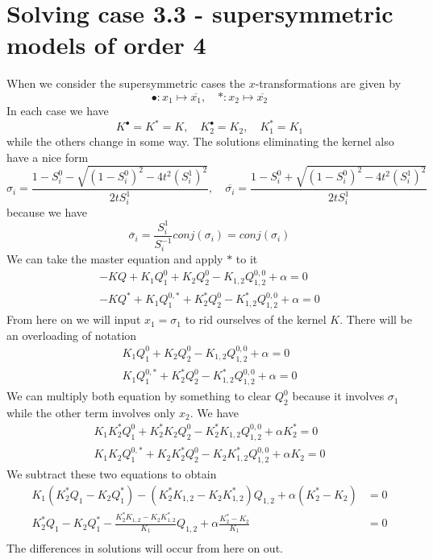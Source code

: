 \documentclass[12pt]{article}
\theoremstyle{definition} \newtheorem{definition}[theorem]{Definition}
\newcommand{\ol}[1]{\overline{#1}}
\newcommand{\exx}{\!\!}
\begin{document}
\section{Solving case 3.3 - supersymmetric models of order 4}
When we consider the supersymmetric cases the $x$-transformations are given by
\[
\bullet : x_1 \mapsto \ol{x_1},\quad\ast: x_2 \mapsto \ol{x_2}
\]
In each case we have
\[
  K^{\bullet} = K^{\ast} = K,\quad K_2^{\bullet} = K_2,\quad K_1^{\ast} = K_1
\]
while the others change in some way. The solutions eliminating the kernel also have a nice form
\[
    \sigma_i = \frac{1-S_i^0-\sqrt{(1-S_i^0)^2-4t^2 (S_i^1)^2}}{2tS_i^1},\quad\ol{\sigma_i} = \frac{1-S_i^0+\sqrt{(1-S_i^0)^2-4t^2 (S_i^1)^2}}{2tS_i^1}
\]
because we have
\[
	\ol{\sigma}_i = \frac{S_i^1}{S_i^{-1}}conj(\sigma_i) = conj(\sigma_i) 
\]
We can take the master equation and apply $\ast$ to it
\begin{align*}
-KQ + K_1 Q_1^0 + K_2 Q_2^0 - K_{1,2}Q_{1,2}^{0,0} + \alpha = 0\\
-KQ^\ast \exx+ K_1 Q_1^{0,\ast} \exx+ K_2^\ast Q_2^0 - K_{1,2}^\ast Q_{1,2}^{0,0} + \alpha = 0
\end{align*}
From here on we will input $x_1 = \sigma_1$ to rid ourselves of the kernel $K$. There will be an overloading of notation
\begin{align*}
K_1 Q_1^0 + K_2 Q_2^0 - K_{1,2}Q_{1,2}^{0,0} + \alpha = 0\\
K_1 Q_1^{0,\ast} \exx+ K_2^\ast Q_2^0 - K_{1,2}^\ast Q_{1,2}^{0,0} + \alpha = 0
\end{align*}
We can multiply both equation by something to clear $Q_2^0$ because it involves $\sigma_1$ while the other term involves only $x_2$. We have
\begin{align*}
K_1 K_2^\ast Q_1^0 +K_2^\ast K_2 Q_2^0 - K_2^\ast K_{1,2}Q_{1,2}^{0,0} + \alpha K_2^\ast= 0\\
K_1 K_2 Q_1^{0,\ast} \exx+ K_2 K_2^\ast Q_2^0 - K_2 K_{1,2}^\ast Q_{1,2}^{0,0} + \alpha K_2 = 0
\end{align*}
We subtract these two equations to obtain
\begin{align*}
    K_1(K_2^\ast Q_1 - K_2 Q_1^\ast) - ( K_2^\ast K_{1,2}- K_2 K_{1,2}^\ast)Q_{1,2}+\alpha (K_2^\ast - K_2) &= 0\\
    K_2^\ast Q_1 - K_2 Q_1^\ast - \frac{ K_2^\ast K_{1,2}- K_2 K_{1,2}^\ast}{K_1}Q_{1,2}+\alpha \frac{K_2^\ast - K_2}{K_1} &= 0\\
\end{align*}
The differences in solutions will occur from here on out.
\end{document}
